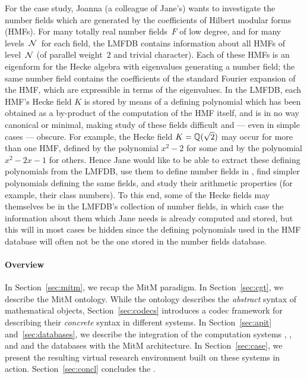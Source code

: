 For the \LMFDB case study, Joanna (a colleague of Jane's) wants to investigate the number fields which are generated by the coefficients of Hilbert modular forms (HMFs).
For many totally real number fields~$F$ of low degree, and for many levels~$\N$\ for each field, the LMFDB contains information about all HMFs of level~$\N$ (of parallel weight~$2$ and trivial character).
Each of these HMFs is an eigenform for the Hecke algebra with eigenvalues generating a number field; the same number field contains the coefficients of the standard Fourier expansion of the HMF, which are expressible in terms of the eigenvalues.
In the LMFDB, each HMF's Hecke field $K$ is stored by means of a defining polynomial which has been obtained as a by-product of the computation of the HMF itself, and is in no way canonical or minimal, making study of these fields difficult and --- even in simple cases --- obscure.
For example, the Hecke field $K=\Q(\sqrt{2})$ may occur for more than one HMF, defined by the polynomial $x^2-2$ for some and by the polynomial $x^2-2x-1$ for others.
Hence Jane would like to be able to extract these defining polynomials from the LMFDB, use them to define number fields in \Sage, find simpler polynomials defining the same fields, and study their arithmetic properties (for example, their class numbers).
To this end, some of the Hecke fields may themselves be in the LMFDB's collection of number fields, in which case the information about them which Jane needs is already computed and stored, but this will in most cases be hidden since the defining polynomials used in the HMF database will often not be the one stored in the number fields database.

\paragraph{Overview}
In Section~\ref{sec:mitm}, we recap the MitM paradigm.
In Section~\ref{sec:cgt}, we describe the MitM ontology.
While the ontology describes the \emph{abstract} syntax of mathematical objects, Section~\ref{sec:codecs} introduces a codec framework for describing their \emph{concrete} syntax in different systems.
In Section~\ref{sec:apit} and~\ref{sec:databases}, we describe the integration of the computation systems \GAP, \Sage, and \Singular and the \lmfdb databases with the MitM architecture.
In Section~\ref{sec:case}, we present the resulting virtual research environment built on
these systems in action.
Section~\ref{sec:concl} concludes the \papertype.

